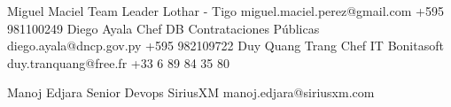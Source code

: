 %
%
%

\begin{referees}
		{Miguel Maciel}
		{Team Leader}
		{Lothar - Tigo}
		{miguel.maciel.perez@gmail.com}
		{+595 981100249}
		{Diego Ayala}
		{Chef DB}
		{Contrataciones Públicas}
		{diego.ayala@dncp.gov.py}
		{+595 982109722}
		{Duy Quang Trang}
		{Chef IT}
		{Bonitasoft}
		{duy.tranquang@free.fr}
		{+33 6 89 84 35 80‬}
\end{referees}

\sectionTitle{}{}
\begin{referees}
		{Manoj Edjara}
		{Senior Devops}
		{SiriusXM}
		{manoj.edjara@siriusxm.com}
\end{referees}